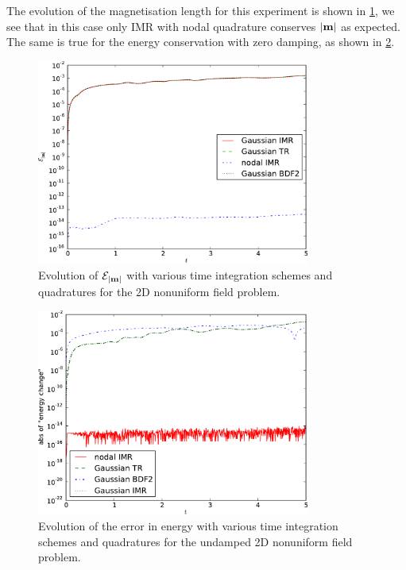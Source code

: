 The evolution of the magnetisation length for this experiment is shown in \cref{fig:nonuniform-h-ml-error}, we see that in this case only IMR with nodal quadrature conserves $\left|{\boldsymbol{\mathrm{m}}} \right|$ as expected.
The same is true for the energy conservation with zero damping, as shown in \cref{fig:nonuniform-h-energy-error}.

\begin{figure}
  \centering
  \includegraphics[width=0.8\textwidth]
  {plots/nonuniform-h-ml/mlengtherrormaxesvstimes.pdf}
  \caption{
    Evolution of $\mathcal{E}_{\left|{\boldsymbol{\mathrm{m}}} \right|}$
    with various time integration schemes and quadratures
    for the 2D nonuniform field problem.
  }
  \label{fig:nonuniform-h-ml-error}
\end{figure}


\begin{figure}
  \centering
  \includegraphics[width=0.8\textwidth]
  {plots/nonuniform-h-energy-change/absofenergychangevstimes.pdf}
  \caption{
    Evolution of the error in energy
    with various time integration schemes and quadratures
    for the undamped 2D nonuniform field problem.
  }
  \label{fig:nonuniform-h-energy-error}
\end{figure}


